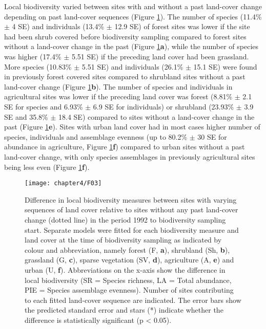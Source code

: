 Local biodiversity varied between sites with and without a past land-cover change depending on past land-cover sequences (Figure \ref{F04_03}). The number of species (11.4\% $\pm$ 4 SE) and individuals (13.4\% $\pm$ 12.9 SE) of forest sites was lower if the site had been shrub covered before biodiversity sampling compared to forest sites without a land-cover change in the past (Figure \ref{F04_03}\textbf{a}), while the number of species was higher (17.4\% $\pm$ 5.51 SE) if the preceding land cover had been grassland. More species (10.83\% $\pm$ 5.51 SE) and individuals (26.1\% $\pm$ 15.1 SE) were found in previously forest covered sites compared to shrubland sites without a past land-cover change (Figure \ref{F04_03}\textbf{b}). The number of species and individuals in agricultural sites was lower if the preceding land cover was forest (8.81\% $\pm$ 2.1 SE for species and 6.93\% $\pm$ 6.9 SE for individuals) or shrubland (23.93\% $\pm$ 3.9 SE and 35.8\% $\pm$ 18.4 SE) compared to sites without a land-cover change in the past (Figure \ref{F04_03}\textbf{e}). Sites with urban land cover had in most cases higher number of species, individuals and assemblage evenness (up to 80.2\% $\pm$ 30 SE for abundance in agriculture, Figure \ref{F04_03}\textbf{f}) compared to urban sites without a past land-cover change, with only species assemblages in previously agricultural sites being less even (Figure \ref{F04_03}\textbf{f}).

\begin{figure}[!hb]
\centering
\texttt{[image: chapter4/F03]}
\caption{ Difference in local biodiversity measures between sites with varying sequences of land cover relative to sites without any past land-cover change (dotted line) in the period 1992 to biodiversity sampling start. Separate models were fitted for each biodiversity measure and land cover at the time of biodiversity sampling as indicated by colour and abbreviation, namely forest (F, \textbf{a}), shrubland (Sh, \textbf{b}), grassland (G, \textbf{c}), sparse vegetation (SV, \textbf{d}), agriculture (A, \textbf{e}) and urban (U, \textbf{f}). Abbreviations on the x-axis show the difference in local biodiversity (SR = Species richness, LA = Total abundance, PIE = Species assemblage evenness). Number of sites contributing to each fitted land-cover sequence are indicated. The error bars show the predicted standard error and stars (*) indicate whether the difference is statistically significant (p < 0.05).}
\label{F04_03}
\end{figure}


